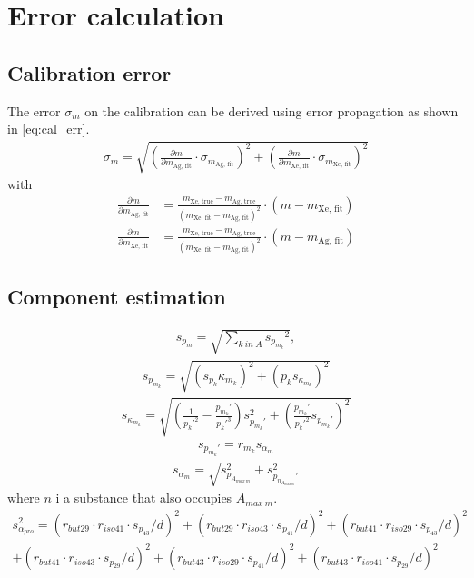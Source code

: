 \section{Error calculation}
\label{app:err}
\subsection{Calibration error}
\label{app:err_cal}
The error $\sigma_{m}$ on the calibration can be derived using error propagation as shown in \eqref{eq:cal_err}.
\begin{align}
    \sigma_m = \sqrt{ \left(\frac{\partial m}{\partial m_\text{Ag, fit}}\cdot \sigma_{m_\text{Ag, fit}}\right)^2 + \left(\frac{\partial m}{\partial m_\text{Xe, fit}}\cdot \sigma_{m_\text{Xe, fit}}\right)^2}
    \label{eq:cal_err}
\end{align}
with
\begin{align}
     \frac{\partial m}{\partial m_\text{Ag, fit}} &= \frac{m_\text{Xe, true} - m_\text{Ag, true}}{(m_\text{Xe, fit} - m_\text{Ag, fit})^2} \cdot (m-m_\text{Xe, fit}) \\
    \frac{\partial m}{\partial m_\text{Xe, fit}} &= \frac{m_\text{Xe, true} - m_\text{Ag, true}}{(m_\text{Xe, fit} - m_\text{Ag, fit})^2} \cdot (m-m_\text{Ag, fit})
\end{align}

\subsection{Component estimation}


\begin{align}
    s_{p_m} =\sqrt{ \sum_{k~in~A} {s_{p_{m_k}}}^2}, 
\end{align}
\begin{align}
    {s_{p_{m_k}}} = \sqrt{({s_{p_k}} \kappa_{m_k})^2 + ({p_k} s_{\kappa_{m_k}})^2}
\end{align}
\begin{align}
    s_{\kappa_{m_k}} = \sqrt{(\frac{1}{p_k'^2}- \frac{p_{m_k}'}{p_k'^3})s_{p_{m_k}'}^2 +  (\frac{p_{m_k}'}{p_k'^2} s_{p_{m_k}'})^2}
\end{align}
\begin{align}
    s_{p_{m_k}'} = r_{m_k} s_{\alpha_m}
\end{align}
\begin{align}
    s_{\alpha_m} = \sqrt{s_{p_{A_{max~m}}}^2 + s_{p_{n_{A_{max~m}}}'}^2}
\end{align}
where $n$ i a substance that also occupies $A_{max~m}$. 
\begin{align}
     s_{\alpha_{pro}}^2= (r_{but29} \cdot r_{iso41} \cdot s_{p_{43}} / d)^2 +  (r_{but29} \cdot r_{iso43} \cdot s_{p_{41}} / d)^2 + ( r_{but41} \cdot r_{iso29} \cdot s_{p_{43}}/d)^2 \\ \nonumber
     + ( r_{but41} \cdot r_{iso43} \cdot s_{p_{29}}/d)^2 +  (r_{but43} \cdot r_{iso29} \cdot s_{p_{41}}/d)^2 + (r_{but43} \cdot r_{iso41} \cdot  s_{p_{29}}/d)^2
\end{align}

